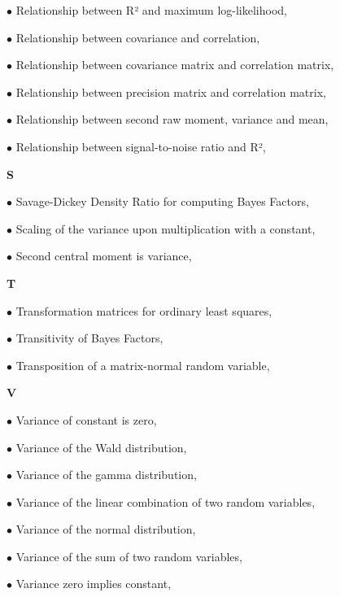 \documentclass[a4paper,12pt,twoside]{book}
\begin{document}
$\bullet$ Relationship between R² and maximum log-likelihood, \pageref{sec:rsq-mll}

$\bullet$ Relationship between covariance and correlation, \pageref{sec:cov-corr}

$\bullet$ Relationship between covariance matrix and correlation matrix, \pageref{sec:covmat-corrmat}

$\bullet$ Relationship between precision matrix and correlation matrix, \pageref{sec:precmat-corrmat}

$\bullet$ Relationship between second raw moment, variance and mean, \pageref{sec:momraw-2nd}

$\bullet$ Relationship between signal-to-noise ratio and R², \pageref{sec:snr-rsq}


\vspace{1em}
\textbf{S}

$\bullet$ Savage-Dickey Density Ratio for computing Bayes Factors, \pageref{sec:bf-sddr}

$\bullet$ Scaling of the variance upon multiplication with a constant, \pageref{sec:var-scal}

$\bullet$ Second central moment is variance, \pageref{sec:momcent-2nd}


\vspace{1em}
\textbf{T}

$\bullet$ Transformation matrices for ordinary least squares, \pageref{sec:mlr-mat}

$\bullet$ Transitivity of Bayes Factors, \pageref{sec:bf-trans}

$\bullet$ Transposition of a matrix-normal random variable, \pageref{sec:matn-trans}


\vspace{1em}
\textbf{V}

$\bullet$ Variance of constant is zero, \pageref{sec:var-const}

$\bullet$ Variance of the Wald distribution, \pageref{sec:wald-var}

$\bullet$ Variance of the gamma distribution, \pageref{sec:gam-var}

$\bullet$ Variance of the linear combination of two random variables, \pageref{sec:var-lincomb}

$\bullet$ Variance of the normal distribution, \pageref{sec:norm-var}

$\bullet$ Variance of the sum of two random variables, \pageref{sec:var-sum}

$\bullet$ Variance zero implies constant, \pageref{sec:var-zero}
\end{document}
